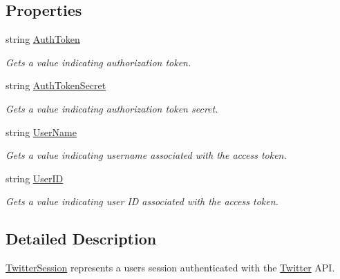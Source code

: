 \subsection*{Properties}
\begin{DoxyCompactItemize}
\item 
string \hyperlink{class_voxel_busters_1_1_native_plugins_1_1_twitter_session_a426b30fd1f024173621de046d1e108cd}{Auth\+Token}
\begin{DoxyCompactList}\small\item\em Gets a value indicating authorization token. \end{DoxyCompactList}\item 
string \hyperlink{class_voxel_busters_1_1_native_plugins_1_1_twitter_session_a03e0793e8ed6eb3c164c61c0b6728a1f}{Auth\+Token\+Secret}
\begin{DoxyCompactList}\small\item\em Gets a value indicating authorization token secret. \end{DoxyCompactList}\item 
string \hyperlink{class_voxel_busters_1_1_native_plugins_1_1_twitter_session_a6ec251e40abde6d9263485e1a237a82f}{User\+Name}
\begin{DoxyCompactList}\small\item\em Gets a value indicating username associated with the access token. \end{DoxyCompactList}\item 
string \hyperlink{class_voxel_busters_1_1_native_plugins_1_1_twitter_session_a385d641024c455dc9b5eb30c98c81ace}{User\+I\+D}
\begin{DoxyCompactList}\small\item\em Gets a value indicating user I\+D associated with the access token. \end{DoxyCompactList}\end{DoxyCompactItemize}


\subsection{Detailed Description}
\hyperlink{class_voxel_busters_1_1_native_plugins_1_1_twitter_session}{Twitter\+Session} represents a user\textquotesingle{}s session authenticated with the \hyperlink{class_voxel_busters_1_1_native_plugins_1_1_twitter}{Twitter} A\+P\+I. 



